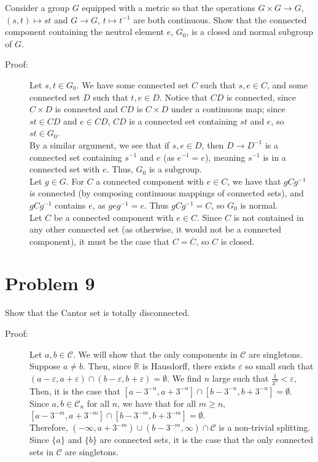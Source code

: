 \documentclass[8pt]{extarticle}
\newcommand{\R}{\mathbb{R}}
\begin{document}
  Consider a group $G$ equipped with a metric so that the operations $G\times G \rightarrow G$, $(s,t)\mapsto st$ and $G\rightarrow G$, $t\mapsto t^{-1}$ are both continuous. Show that the connected component containing the neutral element $e$, $G_0$, is a closed and normal subgroup of $G$.
  \begin{description}
    \item[Proof:] Let $s,t\in G_0$. We have some connected set $C$ such that $s,e\in C$, and some connected set $D$ such that $t,e\in D$. Notice that $CD$ is connected, since $C\times D$ is connected and $CD$ is $C\times D$ under a continuous map; since $st\in CD$ and $e\in CD$, $CD$ is a connected set containing $st$ and $e$, so $st\in G_0$.\\

      By a similar argument, we see that if $s,e\in D$, then $D\rightarrow D^{-1}$ is a connected set containing $s^{-1}$ and $e$ (as $e^{-1} = e$), meaning $s^{-1}$ is in a connected set with $e$. Thus, $G_0$ is a subgroup.\\

      Let $g\in G$. For $C$ a connected component with $e\in C$, we have that $gCg^{-1}$ is connected (by composing continuous mappings of connected sets), and $gCg^{-1}$ contains $e$, as $geg^{-1} = e$. Thus $gCg^{-1} = C$, so $G_0$ is normal.\\

      Let $C$ be a connected component with $e\in C$. Since $C$ is not contained in any other connected set (as otherwise, it would not be a connected component), it must be the case that $C = \overline{C}$, so $C$ is closed.
  \end{description}
  \section{Problem 9}%
  Show that the Cantor set is totally disconnected.
  \begin{description}
    \item[Proof:] Let $a,b\in \mathcal{C}$. We will show that the only components in $\mathcal{C}$ are singletons.\\

      Suppose $a\neq b$. Then, since $\R$ is Hausdorff, there exists $\varepsilon$ so small such that $(a-\varepsilon,a+\varepsilon) \cap (b-\varepsilon,b+\varepsilon) = \emptyset$. We find $n$ large such that $\frac{1}{3^n} < \varepsilon$, Then, it is the case that $[a-3^{-n},a+3^{-n}] \cap [b-3^{-n},b+3^{-n}] = \emptyset$.\\

      Since $a,b\in \mathcal{C}_n$ for all $n$, we have that for all $m\geq n$, $[a-3^{-m},a+3^{-m}] \cap [b-3^{-m},b+3^{-m}] = \emptyset$.\\

      Therefore, $(-\infty,a+3^{-m}) \cup (b-3^{-m},\infty)\cap \mathcal{C}$ is a non-trivial splitting.\\

      Since $\{a\}$ and $\{b\}$ are connected sets, it is the case that the only connected sets in $\mathcal{C}$ are singletons.
  \end{description}
\end{document}
